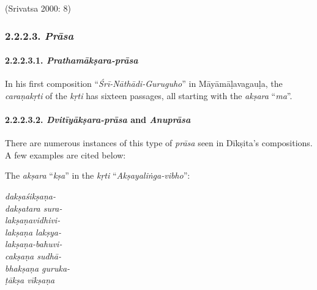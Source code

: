 \begin{flushright}
(Srivatsa 2000: 8)
\end{flushright}

\newpage

\subsubsection*{2.2.2.3. \textit{Prāsa}}

\paragraph*{2.2.2.3.1. \textit{Prathamākṣara-prāsa}}

\vspace{-.3cm}

In his first composition ``\textit{Śrī-Nāthādi-Guruguho}'' in Māyāmāḷavagauḷa, the \textit{caraṇa}\textit{kṛti} of the \textit{kṛti} has sixteen passages, all starting with the \textit{akṣara} ``\textit{ma}''.

\vspace{-.3cm}


\paragraph*{2.2.2.3.2. \textit{Dvitīyākṣara-prāsa} and \textit{Anuprāsa}}

\vspace{-.3cm}

There are numerous instances of this type of \textit{prāsa} seen in Dīkṣita’s compositions. A few examples are cited below:

The \textit{akṣara} “\textit{kṣa}” in the \textit{kṛti} “\textit{Akṣayaliṅga-vibho}”:

\begin{myquote}
\textit{dakṣaśikṣaṇa-}\\ \textit{dakṣatara sura-}\\ \textit{lakṣaṇavidhivi-}\\ \textit{lakṣaṇa lakṣya-}\\ \textit{lakṣaṇa-bahuvi-}\\ \textit{cakṣaṇa sudhā-}\\ \textit{bhakṣaṇa guruka-}\\ \textit{ṭākṣa vīkṣaṇa}
\end{myquote}

